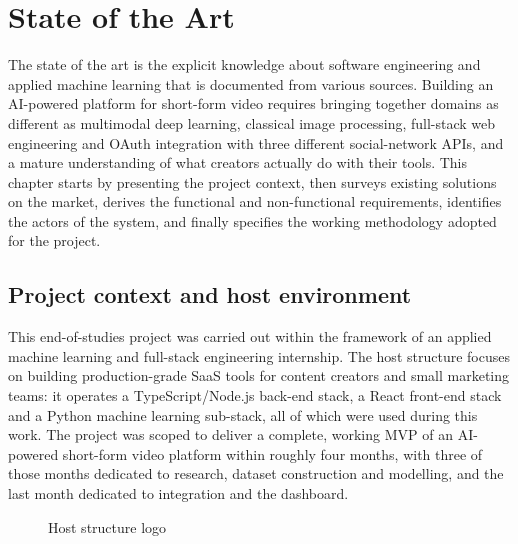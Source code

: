\chapter{State of the Art}

\chapintro
The state of the art is the explicit knowledge about software engineering and applied machine
learning that is documented from various sources. Building an AI-powered platform for
short-form video requires bringing together domains as different as multimodal deep learning,
classical image processing, full-stack web engineering and OAuth integration with three
different social-network APIs, and a mature understanding of what creators actually do with
their tools. This chapter starts by presenting the project context, then surveys existing
solutions on the market, derives the functional and non-functional requirements, identifies
the actors of the system, and finally specifies the working methodology adopted for the
project.

\section{Project context and host environment}
\label{sec:context}

This end-of-studies project was carried out within the framework of an applied machine
learning and full-stack engineering internship. The host structure focuses on building
production-grade SaaS tools for content creators and small marketing teams: it operates a
TypeScript/Node.js back-end stack, a React front-end stack and a Python machine learning
sub-stack, all of which were used during this work. The project was scoped to deliver a
complete, working MVP of an AI-powered short-form video platform within roughly four months,
with three of those months dedicated to research, dataset construction and modelling, and the
last month dedicated to integration and the dashboard.

\begin{figure}[H]
  \centering
  \caption{Host structure logo}
  \label{fig:host_logo}
\end{figure}

